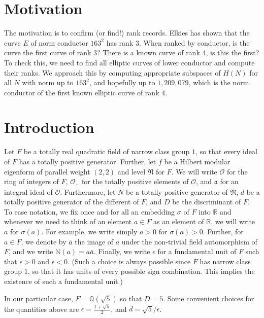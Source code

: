 \documentclass{article}
\theoremstyle{plain}
\begin{document}
\section{Motivation}
The motivation is to confirm (or find!) rank records.
Elkies has shown that the curve $E$ of norm conductor $163^2$ has rank 3.
When ranked by conductor, is the curve the first curve of rank 3?
There is a known curve of rank 4, is this the first?
To check this,
we need to find all elliptic curves of lower conductor and compute their ranks.
We approach this by computing appropriate subspaces of $H(N)$ for all $N$ with norm up to $163^2$,
and hopefully up to $1,209,079$, which is the norm conductor of the first known elliptic curve of rank $4$.

\section{Introduction}

Let $F$ be a totally real quadratic field of narrow class group $1$, so that every ideal of $F$ has a totally positive generator. Further, let $f$ be a Hilbert modular eigenform of parallel weight $(2,2)$ and level $\mathfrak{N}$ for $F$. We will write $\mathcal{O}$ for the ring of integers of $F$, $\mathcal{O}_+$ for the totally positive elements of $\mathcal{O}$, and $\mathfrak{a}$ for an integral ideal of $\mathcal{O}$. Furthermore, let $N$ be a totally positive generator of $\mathfrak{N}$, $d$ be a totally positive generator of the different of $F$, and $D$ be the discriminant of $F$. To ease notation, we fix once and for all an embedding $\sigma$ of $F$ into $\mathbb{R}$ and whenever we need to think of an element $a \in F$ as an element of $\mathbb{R}$, we will write $a$ for $\sigma(a)$. For example, we write simply $a >0$ for $\sigma(a)>0$.  Further, for $a \in F$, we denote by $\bar{a}$ the image of $a$ under the non-trivial field automorphism of $F$, and we write $\mathbb{N}(a)=a\bar{a}$. Finally, we write $\epsilon$ for a fundamental unit of $F$ such that $\epsilon>0$ and $\bar{\epsilon}<0$. (Such a choice is always possible since $F$ has narrow class group $1$, so that it has units of every possible sign combination. This implies the existence of such a fundamental unit.)

In our particular case, $F=\mathbb{Q}(\sqrt{5})$ so that $D=5$. Some convenient choices for the quantities above are $\epsilon=\frac{1+\sqrt{5}}{2}$, and $d=\sqrt{5}/\epsilon$.
\end{document}
